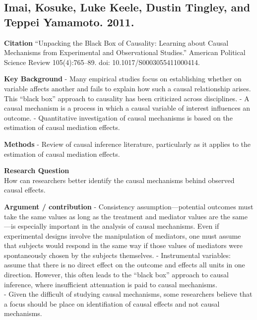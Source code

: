 \documentclass[
]{book}
\begin{document}
\hypertarget{imai-kosuke-luke-keele-dustin-tingley-and-teppei-yamamoto.-2011.}{%
\subsection*{Imai, Kosuke, Luke Keele, Dustin Tingley, and Teppei Yamamoto. 2011.}\label{imai-kosuke-luke-keele-dustin-tingley-and-teppei-yamamoto.-2011.}}

\textbf{Citation} ``Unpacking the Black Box of Causality: Learning about Causal Mechanisms from Experimental and Observational Studies.'' American Political Science Review 105(4):765--89. doi: 10.1017/S0003055411000414.

\textbf{Key Background}
- Many empirical studies focus on establishing whether on variable affects another and fails to explain how such a causal relationship arises. This ``black box'' approach to causality has been criticized across disciplines.
- A causal mechanism is a process in which a causal variable of interest influences an outcome.
- Quantitative investigation of causal mechanisms is based on the estimation of causal mediation effects.

\textbf{Methods}
- Review of causal inference literature, particularly as it applies to the estimation of causal mediation effects.

\textbf{Research Question}\\
How can researchers better identify the causal mechanisms behind observed causal effects.

\textbf{Argument / contribution}
- Consistency assumption---potential outcomes must take the same values as long as the treatment and mediator values are the same---is especially important in the analysis of causal mechanisms. Even if experimental designs involve the manipulation of mediators, one must assume that subjects would respond in the same way if those values of mediators were spontaneously chosen by the subjects themselves.
- Instrumental variables: assume that there is no direct effect on the outcome and effects all units in one direction. However, this often leads to the ``black box'' approach to causal inference, where insufficient attenuation is paid to causal mechanisms.\\
- Given the difficult of studying causal mechanisms, some researchers believe that a focus should be place on identifiation of causal effects and not causal mechanisms.
\end{document}

